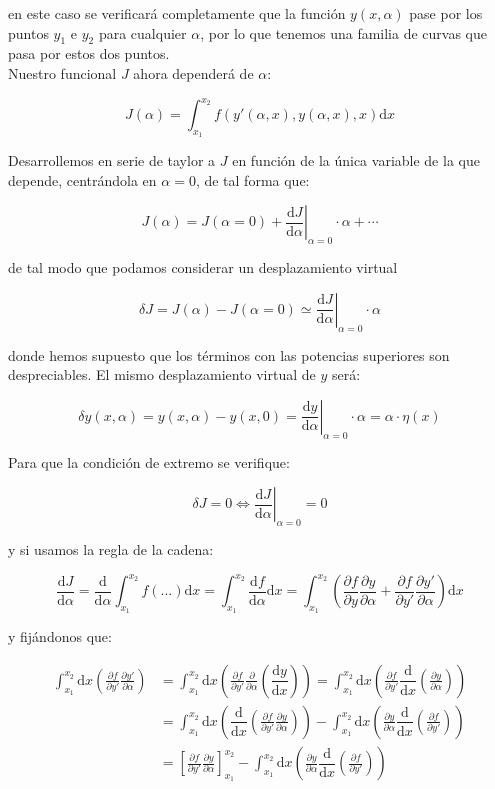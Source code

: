\documentclass[12pt,a4paper]{book}
\newcommand{\parentesis}[1]{\left( #1  \right)}
\newcommand{\parciales}[2]{\frac{\partial #1}{\partial #2}}
\newcommand{\ccorchetes}[1]{\left[ #1  \right]}
\newcommand{\D}{\mathrm{d}}
\newcommand{\intx}{\int_{x_1}^{x_2}}
\begin{document}
en este caso se verificará completamente que la función $y(x,\alpha)$ pase por los puntos $y_1$ e $y_2$ para cualquier $\alpha$, por lo que tenemos una familia de curvas que pasa por estos dos puntos. \\

Nuestro funcional $J$ ahora dependerá de $\alpha$:

\begin{equation}
J(\alpha) = \int_{x_1}^{x_2} f(y'(\alpha,x),y(\alpha,x),x) \D x 
\end{equation}

Desarrollemos en serie de taylor a $J$ en función de la única variable de la que depende, centrándola en $\alpha = 0$, de tal forma que:

\begin{equation}
J(\alpha) = J(\alpha = 0) +  \left. \dfrac{\D J}{\D \alpha} \right|_{\alpha = 0} \cdot \alpha + \cdots
\end{equation}

de tal modo que podamos considerar un desplazamiento virtual

\begin{equation}
\delta J = J (\alpha) - J(\alpha = 0) \simeq \left. \dfrac{\D J}{\D \alpha} \right|_{\alpha = 0} \cdot \alpha
\end{equation}

donde hemos supuesto que los términos con las potencias superiores son despreciables. El mismo desplazamiento virtual de $y$ será:

\begin{equation}
\delta y(x,\alpha) = y(x,\alpha) - y(x,0) = \left. \dfrac{\D y}{\D \alpha} \right|_{\alpha = 0} \cdot \alpha = \alpha \cdot \eta (x)
\end{equation}

Para que la condición de extremo se verifique:

$$ \delta J = 0 \Leftrightarrow \left. \dfrac{\D J}{\D \alpha} \right|_{\alpha = 0} = 0 $$

y si usamos la regla de la cadena:

$$ \dfrac{\D J}{\D \alpha}= \dfrac{\D}{\D \alpha} \int_{x_1}^{x_2} f(...) \D x = \int_{x_1}^{x_2} \dfrac{\D f}{\D \alpha} \D x  = \int_{x_1}^{x_2} \parentesis{\parciales{f}{y}\parciales{y}{\alpha} + \parciales{f}{y'}\parciales{y'}{\alpha}} \D x $$

y fijándonos que:

\begin{align*}
\intx \D x \parentesis{\parciales{f}{y'}\parciales{y'}{\alpha}} & = \intx \D x \parentesis{\parciales{f}{y'} \parciales{}{\alpha} \parentesis{ \dfrac{\D y }{\D x} }} = \intx \D x \parentesis{\parciales{f}{y'} \dfrac{\D}{\D x} \parentesis{ \parciales{y }{\alpha} }} \\
     & = \intx \D x \parentesis{\dfrac{\D}{\D x} \parentesis{\parciales{f}{y'} \parciales{y}{\alpha}}} - \intx \D x \parentesis{\parciales{y}{\alpha} \dfrac{\D}{\D x} \parentesis{\parciales{f}{y'}}}   \\
     & =  \ccorchetes{\parciales{f}{y'} \parciales{y}{\alpha}}_{x_1}^{x_2} - \intx \D x \parentesis{\parciales{y}{\alpha} \dfrac{\D}{\D x} \parentesis{\parciales{f}{y'}}}
\end{align*}
 
\end{document}
